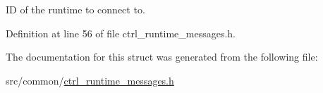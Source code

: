 I\-D of the runtime to connect to. 



Definition at line 56 of file ctrl\-\_\-runtime\-\_\-messages.\-h.



The documentation for this struct was generated from the following file\-:\begin{DoxyCompactItemize}
\item 
src/common/\hyperlink{ctrl__runtime__messages_8h}{ctrl\-\_\-runtime\-\_\-messages.\-h}\end{DoxyCompactItemize}
